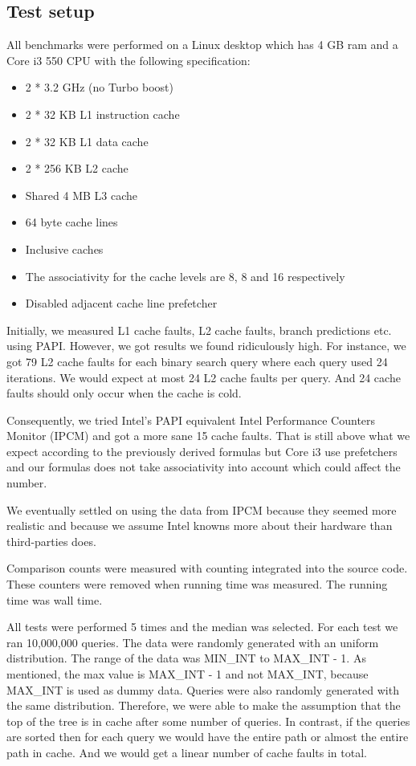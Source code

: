 \subsection{Test setup}

All benchmarks were performed on a Linux desktop which has 4 GB ram and a Core i3 550 CPU with the following specification:

\begin{itemize}
\item 2 * 3.2 GHz (no Turbo boost)
\item 2 * 32 KB L1 instruction cache
\item 2 * 32 KB L1 data cache
\item 2 * 256 KB L2 cache
\item Shared 4 MB L3 cache
\item 64 byte cache lines
\item Inclusive caches
\item The associativity for the cache levels are 8, 8 and 16 respectively
\item Disabled adjacent cache line prefetcher
\end{itemize}

Initially, we measured L1 cache faults, L2 cache faults, branch predictions etc. using PAPI. However, we got results we found ridiculously high.
For instance, we got 79 L2 cache faults for each binary search query where each query used 24 iterations.
We would expect at most 24 L2 cache faults per query. And 24 cache faults should only occur when the cache is cold.

Consequently, we tried Intel's PAPI equivalent Intel Performance Counters Monitor (IPCM) and got a more sane 15 cache faults.
That is still above what we expect according to the previously derived formulas but Core i3 use prefetchers and our formulas does not take associativity into account which could affect the number.

We eventually settled on using the data from IPCM because they seemed more realistic and because we
assume Intel knowns more about their hardware than third-parties does.

Comparison counts were measured with counting integrated into the source code. These counters were removed when running time was measured. The running time was wall time.


All tests were performed 5 times and the median was selected. For each
test we ran 10,000,000 queries. The data were randomly generated with
an uniform distribution. The range of the data was MIN\_INT to
MAX\_INT - 1. As mentioned, the max value is MAX\_INT - 1 and not
MAX\_INT, because MAX\_INT is used as dummy data. Queries were also
randomly generated with the same distribution. Therefore, we were able
to make the assumption that the top of the tree is in cache after some
number of queries. In contrast, if the queries are sorted then for
each query we would have the entire path or almost the entire path in
cache. And we would get a linear number of cache faults in total.

